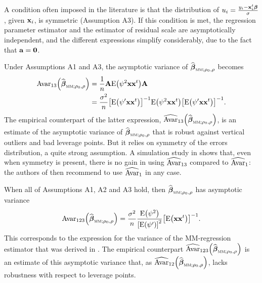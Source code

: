 A condition often imposed in the literature is that the distribution of
$u_{i}=\frac{y_{i}-\mathbf x_{i}^{t}\boldsymbol\beta}{\sigma}$, given
$\mathbf x_{i}$, is symmetric (Assumption A3). If this condition is met, the
regression parameter estimator and the estimator of residual scale are
asymptotically independent, and the different expressions simplify
considerably, due to the fact that $\mathbf{a}=\mathbf 0$.

Under Assumptions A1 and A3, the asymptotic variance of $\widehat
{\boldsymbol\beta}_{\stsc{MM};\rho_{0},\rho}$ becomes
\begin{align*}
\mathrm{Avar}_{13}\left(  \sthat{\boldsymbol\beta}_{\stsc{MM};\rho
_{0},\rho}\right)   &  =\frac{1}{n}\mathbf{A}\mathrm{E}\left(  \psi
^{2}\mathbf{xx}^{t}\right)  \mathbf{A}\\
&  =\frac{\sigma^{2}}{n}\left[  \mathrm{E}\left(  \psi^{\prime}\mathbf{xx}%
^{t}\right)  \right]  ^{-1}\mathrm{E}\left(  \psi^{2}\mathbf{xx}^{t}\right)
\left[  \mathrm{E}\left(  \psi^{\prime}\mathbf{xx}^{t}\right)  \right]  ^{-1}.
\end{align*}
The empirical counterpart of the latter expression, $\sthat{\mathrm{Avar}%
}_{13}\left(  \sthat{\boldsymbol\beta}_{\stsc{MM};\rho_{0},\rho}\right)
$, is an estimate of the asymptotic variance of $\sthat{\boldsymbol\beta%
}_{\stsc{MM};\rho_{0},\rho}$ that is robust against vertical outliers and
bad leverage points. But it relies on symmetry of the errors distribution, a
quite strong assumption. A simulation study in \cite{Croux:2003} shows that, even when symmetry is present, there is no gain in using
$\widehat{\mathrm{Avar}}_{13}$ compared to $\widehat{\mathrm{Avar}}_{1}$: the
authors of \cite{Croux:2003} then recommend to use
$\widehat{\mathrm{Avar}}_{1}$ in any case.

When all of Assumptions A1, A2 and A3 hold, then $\sthat{\boldsymbol\beta%
}_{\stsc{MM};\rho_{0},\rho}$ has asymptotic variance
\[
\mathrm{Avar}_{123}\left(  \sthat{\boldsymbol\beta}_{\stsc{MM};\rho
_{0},\rho}\right)  =\frac{\sigma^{2}}{n}\frac{\mathrm{E}\left(  \psi
^{2}\right)  }{\left[  \mathrm{E}\left(  \psi^{\prime}\right)  \right]  ^{2}%
}\left[  \mathrm{E}\left(  \mathbf{xx}^{t}\right)  \right]  ^{-1}.
\]
This corresponds to the expression for the variance of the MM-regression
estimator that was derived in \cite{yohai:1987}. The empirical counterpart
$\sthat{\mathrm{Avar}}_{123}\left(  \sthat{\boldsymbol\beta%
}_{\stsc{MM};\rho_{0},\rho}\right)  $ is an estimate of this asymptotic
variance that, as $\sthat{\mathrm{Avar}}_{12}\left(  \widehat
{\boldsymbol\beta}_{\stsc{MM};\rho_{0},\rho}\right)  $, lacks robustness
with respect to leverage points.

